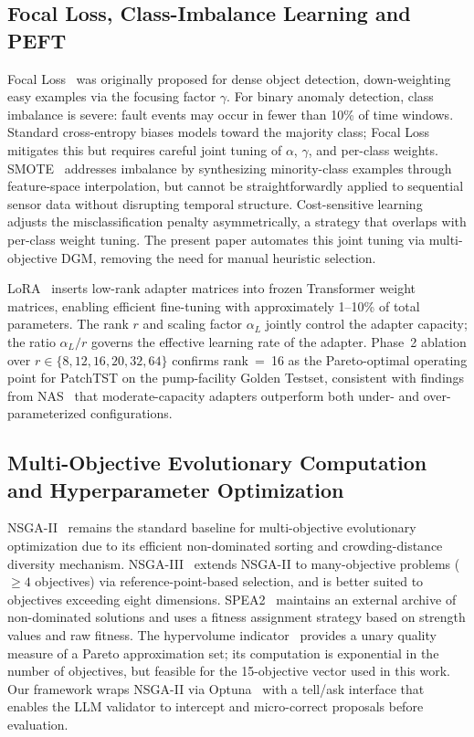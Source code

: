 ﻿\documentclass[twocolumn]{article}
\begin{document}
\subsection{Focal Loss, Class-Imbalance Learning and PEFT}

Focal Loss~\cite{lin2017focal} was originally proposed for dense
object detection, down-weighting easy examples via the focusing
factor $\gamma$.
For binary anomaly detection, class imbalance is severe: fault
events may occur in fewer than 10\% of time windows.
Standard cross-entropy biases models toward the majority class;
Focal Loss mitigates this but requires careful joint tuning of
$\alpha$, $\gamma$, and per-class weights.
SMOTE~\cite{chawla2002smote} addresses imbalance by synthesizing
minority-class examples through feature-space interpolation,
but cannot be straightforwardly applied to sequential sensor data
without disrupting temporal structure.
Cost-sensitive learning~\cite{he2009adasyn} adjusts the
misclassification penalty asymmetrically, a strategy that overlaps
with per-class weight tuning.
The present paper automates this joint tuning via multi-objective
DGM, removing the need for manual heuristic selection.

LoRA~\cite{hu2022lora} inserts low-rank adapter matrices into frozen
Transformer weight matrices, enabling efficient fine-tuning with
approximately 1--10\% of total parameters.
The rank $r$ and scaling factor $\alpha_L$ jointly control the
adapter capacity; the ratio $\alpha_L/r$ governs the effective
learning rate of the adapter.
Phase~2 ablation over $r \in \{8,12,16,20,32,64\}$ confirms
rank~=~16 as the Pareto-optimal operating point for PatchTST
on the pump-facility Golden Testset, consistent with findings
from NAS~\cite{elsken2019nas} that moderate-capacity adapters
outperform both under- and over-parameterized configurations.

\subsection{Multi-Objective Evolutionary Computation and Hyperparameter Optimization}

NSGA-II~\cite{deb2002nsga2} remains the standard baseline for
multi-objective evolutionary optimization due to its efficient
non-dominated sorting and crowding-distance diversity mechanism.
NSGA-III~\cite{deb2014nsga3} extends NSGA-II to many-objective
problems ($\geq 4$ objectives) via reference-point-based selection,
and is better suited to objectives exceeding eight dimensions.
SPEA2~\cite{zitzler2001spea2} maintains an external archive of
non-dominated solutions and uses a fitness assignment strategy
based on strength values and raw fitness.
The hypervolume indicator~\cite{zitzler2003hypervolume} provides
a unary quality measure of a Pareto approximation set;
its computation is exponential in the number of objectives, but
feasible for the 15-objective vector used in this work.
Our framework wraps NSGA-II via Optuna~\cite{akiba2019optuna}
with a tell/ask interface that enables the LLM validator to
intercept and micro-correct proposals before evaluation.
\end{document}
